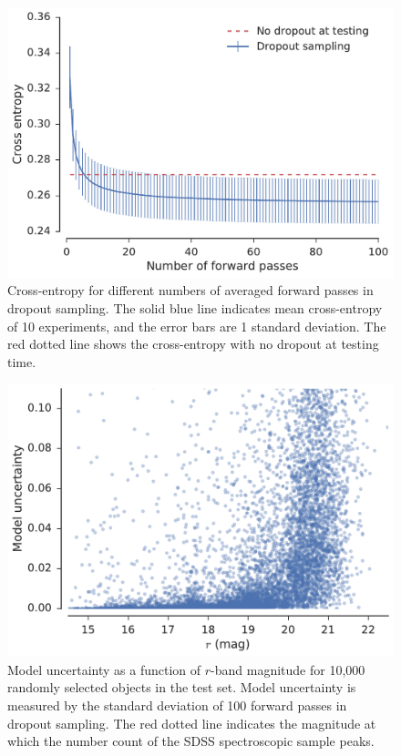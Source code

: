 \begin{figure}
  \centering
  \includegraphics[width=\columnwidth]{figures/mcmc_loss.pdf}
  \caption{
    Cross-entropy for different numbers of averaged forward passes in dropout sampling.
    The solid blue line indicates mean cross-entropy of 10 experiments, and the error bars are 1 standard deviation.
    The red dotted line shows the cross-entropy with no dropout at testing time.
    }
  \label{fig:mcmc_loss}
\end{figure}

\begin{figure}
  \centering
  \includegraphics[width=\columnwidth]{figures/uncertainty_vs_mag.pdf}
  \caption{
    Model uncertainty as a function of $r$-band magnitude for 10,000 randomly selected objects in the test set.
    Model uncertainty is measured by the standard deviation of 100 forward passes in dropout sampling.
    The red dotted line indicates the magnitude at which the number count of the SDSS spectroscopic sample peaks.
    }
  \label{fig:uncertainty_vs_mag}
\end{figure}


\clearpage

